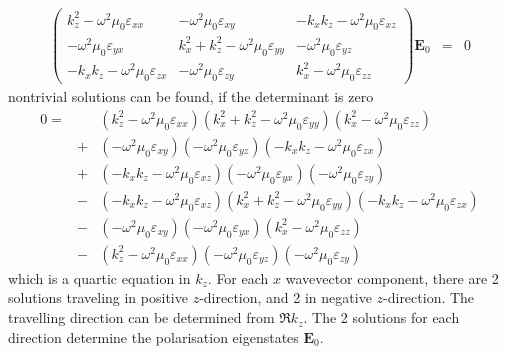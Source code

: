 \documentclass[12pt,a4paper,twoside,openright,BCOR10mm,headsepline,titlepage,abstracton,chapterprefix,final]{scrreprt}
\newcommand\Vector[1]{{\mathbf{#1}}}
\newcommand\vacuum{0}
\newcommand\wavenumber{k}
\newcommand\scalarEfield{E}
\newcommand\Efield{\Vector{\scalarEfield}}
\newcommand\vacuumpermeability{\scalarpermeability_{\vacuum}}
\newcommand\scalarpermeability{\mu}
\newcommand\scalarpermittivity{\varepsilon}
\begin{document}
\begin{eqnarray}
\begin{pmatrix}
 \wavenumber_z^2 - \omega^2 \vacuumpermeability \scalarpermittivity_{xx} 
 &
 - \omega^2 \vacuumpermeability \scalarpermittivity_{xy}
 &
 - \wavenumber_x \wavenumber_z - \omega^2 \vacuumpermeability \scalarpermittivity_{xz}
 \\
 - \omega^2 \vacuumpermeability \scalarpermittivity_{yx}
 &
 \wavenumber_x^2 + \wavenumber_z^2 - \omega^2 \vacuumpermeability \scalarpermittivity_{yy} 
 &
 - \omega^2 \vacuumpermeability \scalarpermittivity_{yz}
 \\
 - \wavenumber_x \wavenumber_z - \omega^2 \vacuumpermeability \scalarpermittivity_{zx}
 &
 - \omega^2 \vacuumpermeability \scalarpermittivity_{zy}
 &
 \wavenumber_x^2 - \omega^2 \vacuumpermeability \scalarpermittivity_{zz}  
\end{pmatrix}
\Efield_0
&=& 0 \label{eq:generalDispersionEigenEquation}
\end{eqnarray}
nontrivial solutions can be found, if the determinant is zero
\begin{eqnarray}
 0 =&&
     ( \wavenumber_z^2 - \omega^2 \vacuumpermeability \scalarpermittivity_{xx} ) 
     ( \wavenumber_x^2 + \wavenumber_z^2 - \omega^2 \vacuumpermeability \scalarpermittivity_{yy} )
     ( \wavenumber_x^2 - \omega^2 \vacuumpermeability \scalarpermittivity_{zz} )
   \nonumber\\
   &+&
     ( - \omega^2 \vacuumpermeability \scalarpermittivity_{xy} )  
     ( - \omega^2 \vacuumpermeability \scalarpermittivity_{yz} )
     ( - \wavenumber_x \wavenumber_z - \omega^2 \vacuumpermeability \scalarpermittivity_{zx} )
   \nonumber\\
   &+&
     ( - \wavenumber_x \wavenumber_z - \omega^2 \vacuumpermeability \scalarpermittivity_{xz} )
     ( - \omega^2 \vacuumpermeability \scalarpermittivity_{yx} )
     ( - \omega^2 \vacuumpermeability \scalarpermittivity_{zy} )
   \nonumber\\
   &-&  
     ( - \wavenumber_x \wavenumber_z - \omega^2 \vacuumpermeability \scalarpermittivity_{xz} )
     (   \wavenumber_x^2 + \wavenumber_z^2 - \omega^2 \vacuumpermeability \scalarpermittivity_{yy} )
     ( - \wavenumber_x \wavenumber_z - \omega^2 \vacuumpermeability \scalarpermittivity_{zx} )
   \nonumber\\
   &-&
     ( - \omega^2 \vacuumpermeability \scalarpermittivity_{xy} )
     ( - \omega^2 \vacuumpermeability \scalarpermittivity_{yx} )
     (   \wavenumber_x^2 - \omega^2 \vacuumpermeability \scalarpermittivity_{zz} )
   \nonumber\\
   &-&
     (   \wavenumber_z^2 - \omega^2 \vacuumpermeability \scalarpermittivity_{xx} )
     ( - \omega^2 \vacuumpermeability \scalarpermittivity_{yz} )
     (  - \omega^2 \vacuumpermeability \scalarpermittivity_{zy} )
\end{eqnarray}
which is a quartic equation in $\wavenumber_z$. 
For each $x$ wavevector component, there are 2 solutions traveling in positive $z$-direction, and 2 in negative $z$-direction.
The travelling direction can be determined from $\Re \wavenumber_z$. 
The 2 solutions for each direction determine the polarisation eigenstates $\Efield_0$.
\end{document}
